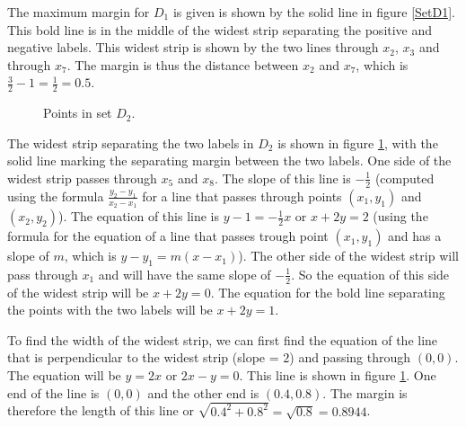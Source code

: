 \begin{enumerate}
\begin{enumerate}
The maximum margin for $D_1$ is given is shown by the solid line in figure \ref{SetD1}. This bold line is in the middle of the widest strip separating the positive and negative labels. This widest strip is shown by the two lines through $x_2$, $x_3$ and through $x_7$. The margin is thus the distance between $x_2$ and $x_7$, which is $\frac{3}{2} -1 = \frac{1}{2} =0.5$.

   
   \begin{figure}[H]
    \centering
    \caption{Points in set $D_2$.} \label{SetD2}
  \end{figure}  

The widest strip separating the two labels in $D_2$ is shown in figure \ref{SetD2}, with the solid line marking the separating margin between the two labels. One side of the widest strip passes through $x_5$ and $x_8$. The slope of this line is $-\frac{1}{2}$ (computed using the formula $\frac{y_2 - y_1}{x_2 - x_1}$ for a line that passes through points $(x_1, y_1)$ and $(x_2, y_2)$). The equation of this line is $y-1=-\frac{1}{2}x$ or $x+2y=2$ (using the formula for the equation of a line that passes trough point $(x_1, y_1)$ and has a slope of $m$, which is $y-y_1 = m(x-x_1)$). The other side of the widest strip will pass through $x_1$ and will have the same slope of $-\frac{1}{2}$. So the equation of this side of the widest strip will be $x+2y=0$. The equation for the bold line separating the points with the two labels will be $x+2y=1$.

To find the width of the widest strip, we can first find the equation of the line that is perpendicular to the widest strip (slope = $2$) and passing through $(0,0)$. The equation will be $y=2x$ or $2x-y=0$. This line is shown in figure \ref{SetD2}. One end of the line is $(0,0)$ and the other end is $(0.4,0.8)$. The margin is therefore the length of this line or $\sqrt{0.4^2 + 0.8^2} = \sqrt{0.8}=0.8944$.
   

\end{enumerate}
\end{enumerate}
